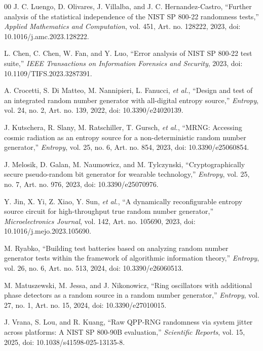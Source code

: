 \documentclass[conference]{IEEEtran}
\begin{document}
\begin{thebibliography}{00}
 J. C. Luengo, D. Olivares, J. Villalba, and J. C. Hernandez-Castro, ``Further analysis of the statistical independence of the NIST SP 800-22 randomness tests,'' \textit{Applied Mathematics and Computation}, vol. 451, Art. no. 128222, 2023, doi: 10.1016/j.amc.2023.128222.

 L. Chen, C. Chen, W. Fan, and Y. Luo, ``Error analysis of NIST SP 800-22 test suite,'' \textit{IEEE Transactions on Information Forensics and Security}, 2023, doi: 10.1109/TIFS.2023.3287391.

 A. Crocetti, S. Di Matteo, M. Nannipieri, L. Fanucci, \textit{et al.}, ``Design and test of an integrated random number generator with all-digital entropy source,'' \textit{Entropy}, vol. 24, no. 2, Art. no. 139, 2022, doi: 10.3390/e24020139.

 J. Kutschera, R. Slany, M. Ratschiller, T. Gursch, \textit{et al.}, ``MRNG: Accessing cosmic radiation as an entropy source for a non-deterministic random number generator,'' \textit{Entropy}, vol. 25, no. 6, Art. no. 854, 2023, doi: 10.3390/e25060854.

 J. Melosik, D. Galan, M. Naumowicz, and M. Tylczynski, ``Cryptographically secure pseudo-random bit generator for wearable technology,'' \textit{Entropy}, vol. 25, no. 7, Art. no. 976, 2023, doi: 10.3390/e25070976.

 Y. Jin, X. Yi, Z. Xiao, Y. Sun, \textit{et al.}, ``A dynamically reconfigurable entropy source circuit for high-throughput true random number generator,'' \textit{Microelectronics Journal}, vol. 142, Art. no. 105690, 2023, doi: 10.1016/j.mejo.2023.105690.

 M. Ryabko, ``Building test batteries based on analyzing random number generator tests within the framework of algorithmic information theory,'' \textit{Entropy}, vol. 26, no. 6, Art. no. 513, 2024, doi: 10.3390/e26060513.

 M. Matuszewski, M. Jessa, and J. Nikonowicz, ``Ring oscillators with additional phase detectors as a random source in a random number generator,'' \textit{Entropy}, vol. 27, no. 1, Art. no. 15, 2024, doi: 10.3390/e27010015.

 J. Vrana, S. Lou, and R. Kuang, ``Raw QPP-RNG randomness via system jitter across platforms: A NIST SP 800-90B evaluation,'' \textit{Scientific Reports}, vol. 15, 2025, doi: 10.1038/s41598-025-13135-8.
\end{thebibliography}
\end{document}
